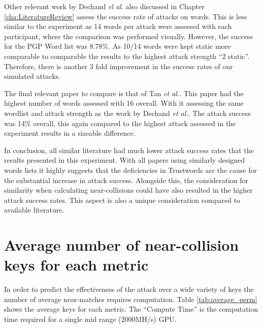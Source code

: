 Other relevant work by Dechand \textit{el al.}\cite{dechand2016empirical} also discussed in Chapter \ref{cha:LiteratureReview} assess the success rate of attacks on words. This is less similar to the experiment as 14 words per attack were assessed with each participant, where the comparison was performed visually. However, the success for the PGP Word list was 8.78\%. As 10/14 words were kept static more comparable to comparable the results to the highest attack strength ``2 static''. Therefore, there is another 3 fold improvement in the success rates of our simulated attacks. 

The final relevant paper to compare is that of Tan \textit{et al.}. This paper had the highest number of words assessed with 16 overall. With it assessing the same wordlist and attack strength as the work by Dechand \textit{et al.}. The attack success was 14\% overall, this again compared to the highest attack assessed in the experiment results in a sizeable difference.

In conclusion, all similar literature had much lower attack success rates that the results presented in this experiment. With all papers using similarly designed words lists it highly suggests that the deficiencies in Trustwords are the cause for the substantial increase in attack success. Alongside this, the consideration for similarity when calculating near-collisions could have also resulted in the higher attack success rates. This aspect is also a unique consideration compared to available literature.


\section{Average number of near-collision keys for each metric}
In order to predict the effectiveness of the attack over a wide variety of keys the number of average near-matches requires computation. Table \ref{tab:average_perm} shows the average keys for each metric. The ``Compute Time'' is the computation time required for a single mid range (2000MH/s) GPU.

